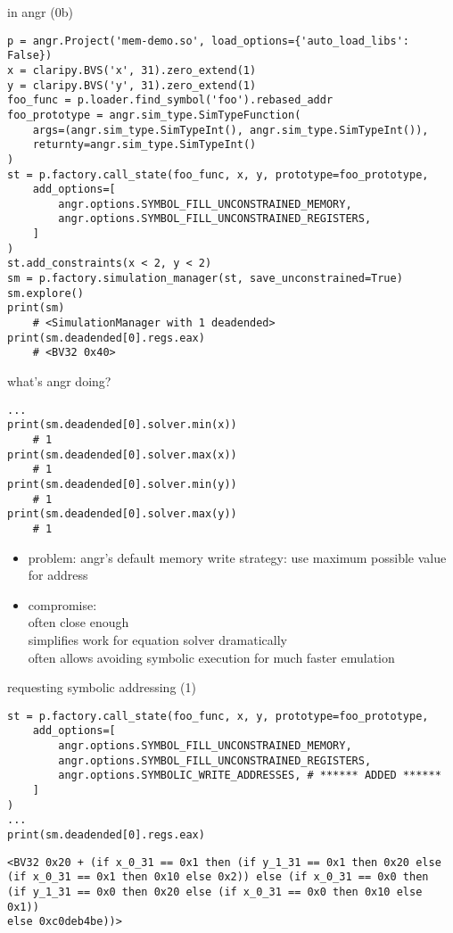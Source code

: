 \begin{frame}[fragile]{in angr (0b)}
\begin{Verbatim}[fontsize=\fontsize{9}{10}\selectfont]
p = angr.Project('mem-demo.so', load_options={'auto_load_libs': False})
x = claripy.BVS('x', 31).zero_extend(1)
y = claripy.BVS('y', 31).zero_extend(1)
foo_func = p.loader.find_symbol('foo').rebased_addr
foo_prototype = angr.sim_type.SimTypeFunction(
    args=(angr.sim_type.SimTypeInt(), angr.sim_type.SimTypeInt()),
    returnty=angr.sim_type.SimTypeInt()
)
st = p.factory.call_state(foo_func, x, y, prototype=foo_prototype,
    add_options=[
        angr.options.SYMBOL_FILL_UNCONSTRAINED_MEMORY,
        angr.options.SYMBOL_FILL_UNCONSTRAINED_REGISTERS,
    ]
)
st.add_constraints(x < 2, y < 2)
sm = p.factory.simulation_manager(st, save_unconstrained=True)
sm.explore()
print(sm)
    # <SimulationManager with 1 deadended>
print(sm.deadended[0].regs.eax)
    # <BV32 0x40>
\end{Verbatim}
\end{frame}

\begin{frame}[fragile]{what's angr doing?}
\begin{Verbatim}[fontsize=\fontsize{11}{12}]
...
print(sm.deadended[0].solver.min(x))
    # 1
print(sm.deadended[0].solver.max(x))
    # 1
print(sm.deadended[0].solver.min(y))
    # 1
print(sm.deadended[0].solver.max(y))
    # 1
\end{Verbatim}
\begin{itemize}
\item problem: angr's default memory write strategy: use maximum possible value for address
\item compromise: \\
often close enough \\
simplifies work for equation solver dramatically \\
often allows avoiding symbolic execution for much faster emulation 
\end{itemize}
\end{frame}

\begin{frame}[fragile]{requesting symbolic addressing (1)}
\begin{Verbatim}[fontsize=\fontsize{10}{11}]
st = p.factory.call_state(foo_func, x, y, prototype=foo_prototype,
    add_options=[
        angr.options.SYMBOL_FILL_UNCONSTRAINED_MEMORY,
        angr.options.SYMBOL_FILL_UNCONSTRAINED_REGISTERS,
        angr.options.SYMBOLIC_WRITE_ADDRESSES, # ****** ADDED ******
    ]
)
...
print(sm.deadended[0].regs.eax)
\end{Verbatim}
\hrulefill
\begin{Verbatim}[fontsize=\fontsize{10}{11}]
<BV32 0x20 + (if x_0_31 == 0x1 then (if y_1_31 == 0x1 then 0x20 else
(if x_0_31 == 0x1 then 0x10 else 0x2)) else (if x_0_31 == 0x0 then
(if y_1_31 == 0x0 then 0x20 else (if x_0_31 == 0x0 then 0x10 else 0x1))
else 0xc0deb4be))>
\end{Verbatim}
\end{frame}

